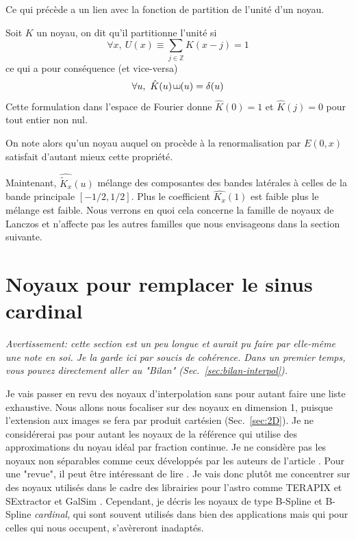 \documentclass[11pt,twoside]{article}
\DeclareMathOperator{\comb}{\raisebox{\depth}{\rotatebox{270}{$\exists$}}}
\begin{document}
Ce qui précède a un lien avec la fonction de partition de l'unité d'un noyau.
\begin{propriete}\label{prop:unite}
Soit $K$ un noyau, on dit  qu'il partitionne l'unité si
\begin{equation}
\forall x,\ U(x)\equiv \sum_{j\in\mathbb{Z}} K(x-j) = 1 
\end{equation} 
ce qui a pour conséquence (et vice-versa)
\begin{equation}
\forall u,\ \hat{K}(u) \comb(u)=\delta(u)
\end{equation}
Cette formulation dans l'espace de Fourier donne $\hat{K}(0)=1$ et $\hat{K}(j)=0$ pour tout entier non nul.
\end{propriete} 
On note alors qu'un noyau auquel on procède à la renormalisation par $E(0,x)$ satisfait d'autant mieux cette propriété.
 

Maintenant,  $\widehat{\tilde{K}_x}(u)$ mélange des composantes des  bandes latérales à celles de la bande principale $[-1/2,1/2]$. Plus le coefficient $\hat{K_x}(1)$ est faible plus le mélange est faible. Nous verrons en quoi cela concerne la famille de noyaux de Lanczos et n'affecte pas les autres familles que nous envisageons dans la section suivante.
%
\section{Noyaux pour remplacer le sinus cardinal}
\label{sec:kernel-for-sinuscard-period}
%

\textit{Avertissement: cette section est un peu longue et aurait pu faire par elle-même une note en soi. Je la garde ici par soucis de cohérence. Dans un premier temps, vous pouvez directement aller au "Bilan" (Sec.~\ref{sec:bilan-interpol}).  
}

Je vais passer en revu des noyaux d'interpolation sans pour autant faire une liste exhaustive. Nous allons nous focaliser sur des noyaux en dimension 1, puisque l'extension aux images se fera par produit cartésien (Sec.~\ref{sec:2D}). Je ne considérerai pas pour autant les noyaux de la référence \citep{HU200646} qui utilise des approximations du noyau idéal par fraction continue. Je ne considère pas les noyaux non séparables comme ceux développés par les auteurs de l'article \citep{Shi2006ImageIB}. Pour une "revue", il peut être intéressant de lire \cite{Parsania2016}. Je vais donc plutôt me concentrer sur des noyaux utilisés dans le cadre des librairies pour l'astro comme \textsf{TERAPIX}  et \textsf{SExtractor} \citep{2011ASPC..442..435B} et \textsf{GalSim} \citep{2015A&C....10..121R}. Cependant, je décris les noyaux de type B-Spline et B-Spline \textit{cardinal}, qui sont souvent utilisés dans bien des applications mais qui pour celles qui nous occupent, s'avèreront inadaptés.
%
\end{document}
